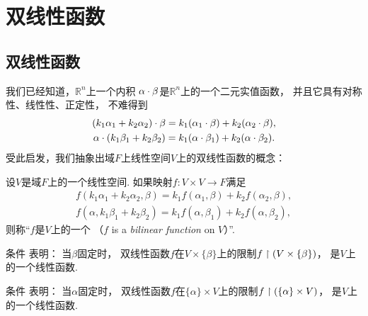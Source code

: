 \section{双线性函数}
\subsection{双线性函数}
我们已经知道，\(\mathbb{R}^n\)上一个内积
\(\alpha\cdot\beta\)是\(\mathbb{R}^n\)上的一个二元实值函数，
并且它具有对称性、线性性、正定性，
不难得到\begin{gather*}
	(k_1\alpha_1+k_2\alpha_2)\cdot\beta
	= k_1(\alpha_1\cdot\beta)
	+ k_2(\alpha_2\cdot\beta), \\
	\alpha\cdot(k_1\beta_1+k_2\beta_2)
	= k_1(\alpha\cdot\beta_1)
	+ k_2(\alpha\cdot\beta_2).
\end{gather*}
受此启发，我们抽象出域\(F\)上线性空间\(V\)上的双线性函数的概念：
\begin{definition}
设\(V\)是域\(F\)上的一个线性空间.
如果映射\(f\colon V \times V \to F\)满足\begin{gather}
	f(k_1\alpha_1+k_2\alpha_2,\beta)
	= k_1 f(\alpha_1,\beta)
	+ k_2 f(\alpha_2,\beta),
		\label{equation:双线性函数.双线性函数判定条件1} \\
	f(\alpha,k_1\beta_1+k_2\beta_2)
	= k_1 f(\alpha,\beta_1)
	+ k_2 f(\alpha,\beta_2),
		\label{equation:双线性函数.双线性函数判定条件2}
\end{gather}
则称“\(f\)是\(V\)上的一个%
（\(f\) is a \emph{bilinear function} on \(V\)）”.
\end{definition}
\begin{remark}
条件  表明：
当\(\beta\)固定时，
双线性函数\(f\)在\(V \times \{\beta\}\)上的限制\(f \upharpoonright (V \times \{\beta\})\)，
是\(V\)上的一个线性函数.
\end{remark}
\begin{remark}
条件  表明：
当\(\alpha\)固定时，
双线性函数\(f\)在\(\{\alpha\} \times V\)上的限制\(f \upharpoonright (\{\alpha\} \times V)\)，
是\(V\)上的一个线性函数.
\end{remark}

